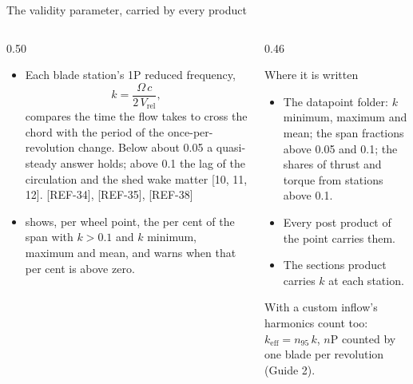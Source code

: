\begin{frame}{The validity parameter, carried by every product}
\begin{columns}[T]
\begin{column}{0.50\textwidth}
\begin{itemize}\small
  \item Each blade station's 1P reduced frequency,
        \[ k = \frac{\Omega\,c}{2\,V_\mathrm{rel}}, \]
        compares the time the flow takes to cross the chord with the period of
        the once-per-revolution change. Below about 0.05 a quasi-steady
        answer holds; above 0.1 the lag of the circulation and the shed wake
        matter [10, 11, 12]. [REF-34], [REF-35], [REF-38]
  \item {} shows, per wheel point, the per cent of the span with
        \(k > 0.1\) and \(k\) minimum, maximum and mean, and warns when that
        per cent is above zero.
\end{itemize}
\end{column}
\begin{column}{0.46\textwidth}
\begin{block}{Where it is written}
\small
\begin{itemize}\small
  \item The datapoint folder: \(k\) minimum, maximum and mean; the span
        fractions above 0.05 and 0.1; the shares of thrust and torque from
        stations above 0.1.
  \item Every post product of the point carries them.
  \item The sections product carries \(k\) at each station.
\end{itemize}
\end{block}
{\scriptsize With  a custom inflow's harmonics count too:
\(k_\mathrm{eff} = n_{95}\,k\), \(n\)P counted by one blade per revolution
(Guide 2).\par}
\end{column}
\end{columns}
\end{frame}
